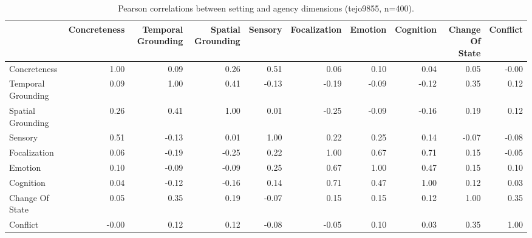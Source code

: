 \begin{table}[ht]
\caption{Pearson correlations between setting and agency dimensions (tejo9855, n=400).}
\label{tab:pearson_feature_corr}
\begin{tabular}{lrrrrrrrrr}
\toprule
 & Concreteness & Temporal Grounding & Spatial Grounding & Sensory & Focalization & Emotion & Cognition & Change Of State & Conflict \\
\midrule
Concreteness & 1.00 & 0.09 & 0.26 & 0.51 & 0.06 & 0.10 & 0.04 & 0.05 & -0.00 \\
Temporal Grounding & 0.09 & 1.00 & 0.41 & -0.13 & -0.19 & -0.09 & -0.12 & 0.35 & 0.12 \\
Spatial Grounding & 0.26 & 0.41 & 1.00 & 0.01 & -0.25 & -0.09 & -0.16 & 0.19 & 0.12 \\
Sensory & 0.51 & -0.13 & 0.01 & 1.00 & 0.22 & 0.25 & 0.14 & -0.07 & -0.08 \\
Focalization & 0.06 & -0.19 & -0.25 & 0.22 & 1.00 & 0.67 & 0.71 & 0.15 & -0.05 \\
Emotion & 0.10 & -0.09 & -0.09 & 0.25 & 0.67 & 1.00 & 0.47 & 0.15 & 0.10 \\
Cognition & 0.04 & -0.12 & -0.16 & 0.14 & 0.71 & 0.47 & 1.00 & 0.12 & 0.03 \\
Change Of State & 0.05 & 0.35 & 0.19 & -0.07 & 0.15 & 0.15 & 0.12 & 1.00 & 0.35 \\
Conflict & -0.00 & 0.12 & 0.12 & -0.08 & -0.05 & 0.10 & 0.03 & 0.35 & 1.00 \\
\bottomrule
\end{tabular}
\end{table}
